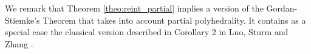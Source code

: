 \documentclass{article}
\newcommand{\reInt}{\mathrm{ri}\,}
\newcommand{\inProd}[2]{\langle #1 , #2 \rangle }
\newcommand{\feasS}{\mathcal{F}_{\text{D }}^s}
\newcommand{\minFaceD}{ {\mathcal{F}_{\min}^D}}
\newcommand{\stdMap}{ {\mathcal{A}}}
\newcommand{\stdMapAlt}{ {\mathcal{B}}}
\newcommand{\stdCone}{ {\mathcal{K}}}
\newcommand{\opt}[1]{ {\theta _{#1}}}
\newcommand{\intPoint}{{e}}
\renewcommand{\Re}{\mathbb{R}}
\newcommand{\T}{\ast\hspace{-1pt}}
\newtheorem{proposition}[definition]{Proposition}
\begin{document}
%		
%		
%


We remark that Theorem \ref{theo:reint_partial} implies a version of the Gordan-Stiemke's Theorem that takes into account partial polyhedrality.  It contains as a special case the classical version described in Corollary 2 in
Luo, Sturm and Zhang \cite{Luo97dualityresults}. 
\end{document}
